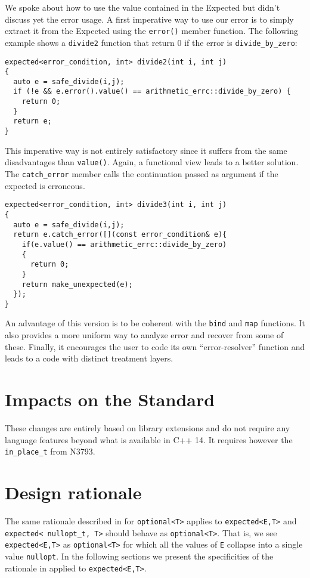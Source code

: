\documentclass[a4paper,10pt]{article}
\newcommand{\cpp}[1]{\lstinline{#1}}
\begin{document}
We spoke about how to use the value contained in the Expected but didn't discuss yet the error usage. A first imperative way to use our error is to simply extract it from the Expected using the \cpp{error()} member function. The following example shows a \cpp{divide2} function that return 0 if the error is \cpp{divide_by_zero}:

\begin{lstlisting}
expected<error_condition, int> divide2(int i, int j)
{
  auto e = safe_divide(i,j);
  if (!e && e.error().value() == arithmetic_errc::divide_by_zero) {
    return 0;
  }
  return e;
}
\end{lstlisting}

This imperative way is not entirely satisfactory since it suffers from the same disadvantages than \cpp{value()}. Again, a functional view leads to a better solution. The \cpp{catch_error} member calls the continuation passed as argument if the expected is erroneous.

\begin{lstlisting}
expected<error_condition, int> divide3(int i, int j)
{
  auto e = safe_divide(i,j);
  return e.catch_error([](const error_condition& e){
    if(e.value() == arithmetic_errc::divide_by_zero)
    {
      return 0;
    }
    return make_unexpected(e);
  });
}
\end{lstlisting}

An advantage of this version is to be coherent with the \cpp{bind} and \cpp{map} functions. It also provides a more uniform way to analyze error and recover from some of these. Finally, it encourages the user to code its own ``error-resolver'' function and leads to a code with distinct treatment layers.

\section{Impacts on the Standard}

These changes are entirely based on library extensions and do not require any language features beyond what is available in C++ 14. It requires however the \cpp{in_place_t} from N3793.

\section{Design rationale}

The same rationale described in \cite{OptionalRev4} for \cpp{optional<T>} applies to \cpp{expected<E,T>} and \cpp{expected< nullopt_t, T>} should behave as \cpp{optional<T>}.  That is, we see \cpp{expected<E,T>} as \cpp{optional<T>} for which all the values of \cpp{E} collapse into a single value \cpp{nullopt}. In the following sections we present the specificities of the rationale in \cite{OptionalRev4} applied to  \cpp{expected<E,T>}.
\end{document}
